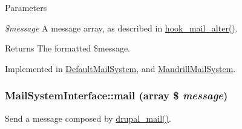 \begin{DoxyParams}{Parameters}
\item[{\em \$message}]A message array, as described in \hyperlink{group__hooks_gaad1d55a8e7b359933f462a9ca5b2ede0}{hook\_\-mail\_\-alter()}.\end{DoxyParams}
\begin{DoxyReturn}{Returns}
The formatted \$message. 
\end{DoxyReturn}


Implemented in \hyperlink{classDefaultMailSystem_a74a139262d6be87cc6c341fb48076cc1}{DefaultMailSystem}, and \hyperlink{classMandrillMailSystem_a4e7e619d5560224017ccc438c31e40d6}{MandrillMailSystem}.\hypertarget{interfaceMailSystemInterface_a8dd560f7879b93d1fd3497b27a3b08f7}{
\subsubsection[{mail}]{\setlength{\rightskip}{0pt plus 5cm}MailSystemInterface::mail (array \$ {\em message})}}
\label{interfaceMailSystemInterface_a8dd560f7879b93d1fd3497b27a3b08f7}
Send a message composed by \hyperlink{mail_8inc_ab80781fd7273975a77cbbd13300eddbf}{drupal\_\-mail()}.


